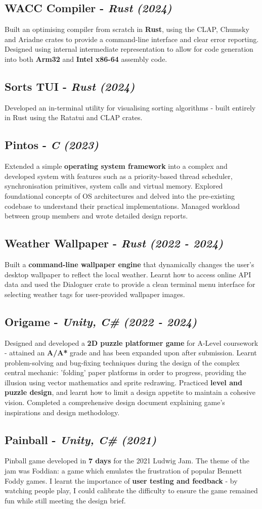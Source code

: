 \documentclass{article}
\newcommand{\dates}[1]{\hfill\textit{(#1)}}
\newcommand{\project}[4]{
    \subsection*{\textbf{#1} - \textit{#3} \dates{#2}}\hfill
    \begin{minipage}{\dimexpr\textwidth - 1em}
        #4
    \end{minipage}
}
\begin{document}
\project{WACC Compiler }{2024}{Rust}{
    Built an optimising compiler from scratch in \textbf{Rust}, using the CLAP, Chumsky and Ariadne crates to provide a command-line interface
    and clear error reporting. Designed using internal intermediate representation to allow for code generation into both
    \textbf{Arm32} and \textbf{Intel x86-64} assembly code.
}

\project{Sorts TUI}{2024}{Rust}{
    Developed an in-terminal utility for visualising sorting algorithms - built entirely in Rust using the Ratatui and CLAP crates.
}

\project{Pintos }{2023}{C}{
    Extended a simple \textbf{operating system framework} into a complex and developed system with features such as a priority-based thread scheduler, 
    synchronisation primitives, system calls and virtual memory. Explored foundational concepts of OS architectures and delved into the
    pre-existing codebase to understand their practical implementations. Managed workload between group members and wrote detailed design reports. 
}

\project{Weather Wallpaper}{2022 - 2024}{Rust}{
    Built a \textbf{command-line wallpaper engine} that dynamically changes the user's desktop wallpaper to reflect the local weather. 
    Learnt how to access online API data and used the Dialoguer crate to provide a clean terminal menu interface for selecting weather tags for 
    user-provided wallpaper images.
}

\project{Origame}{2022 - 2024}{Unity, C\#}{
    Designed and developed a \textbf{2D puzzle platformer game} for A-Level coursework - attained an \textbf{A/A*} grade
    and has been expanded upon after submission. Learnt problem-solving and bug-fixing techniques during the design of the complex central mechanic: 
    'folding' paper platforms in order to progress, providing the illusion using vector mathematics and sprite redrawing.
    Practiced \textbf{level and puzzle design}, and learnt how to limit a design appetite to maintain a cohesive vision.  
    Completed a comprehensive design document explaining game's inspirations and design methodology.
}

\project{Painball}{2021}{Unity, C\#}{
    Pinball game developed in \textbf{7 days} for the 2021 Ludwig Jam. The theme of the jam was Foddian: a game
    which emulates the frustration of popular Bennett Foddy games.
    I learnt the importance of \textbf{user testing and feedback} - by watching people play, I could calibrate the difficulty
    to ensure the game remained fun while still meeting the design brief. 
}
    
\end{document}
